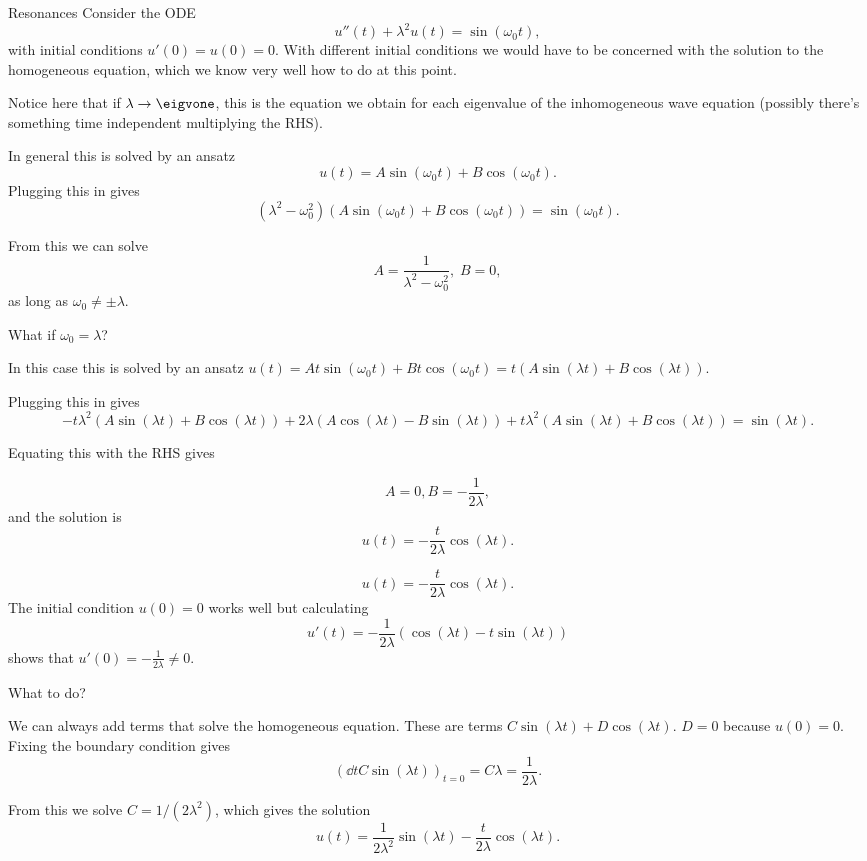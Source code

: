 \begin{frame}{Resonances}
	Consider the ODE 
	\[ u''(t) + \lambda^2 u(t) = \sin(\omega_0 t), \]
	with initial conditions $ u'(0)=u(0) = 0 $. With different initial conditions we would have to be concerned with the solution to the homogeneous equation, which we know very well how to do at this point.
	
	\pause
	Notice here that if $ \lambda \to \eigvone $, this is the equation we obtain for each eigenvalue of the inhomogeneous wave equation (possibly there's something time independent multiplying the RHS). 
	
	\pause
	In general this is solved by an ansatz \[ u(t) = A \sin(\omega_0 t) + B \cos(\omega_0 t). \]
	Plugging this in gives 
	\[  (\lambda^2 -\omega_0^2) (A \sin(\omega_0 t) + B \cos(\omega_0 t)) = \sin(\omega_0 t). \]
\end{frame}

\begin{frame}
	From this we can solve 
	\[ A = \frac{1}{\lambda^2-\omega_0^2}, \; B=0, \]
	as long as $ \omega_0 \neq \pm \lambda $.
	
	\pause
	What if $ \omega_0 = \lambda $?
	
	\pause
	In this case this is solved by an ansatz $ u(t) = A t \sin(\omega_0 t) + B t \cos(\omega_0 t) = t(A  \sin(\lambda t) + B  \cos(\lambda t))$. 
	
	\pause
	Plugging this in gives
	\[ 
	-t \lambda^2 (A  \sin(\lambda t) + B  \cos(\lambda t) ) 
	+ 2 \lambda (A \cos(\lambda t) - B \sin(\lambda t)  ) 
	+ t\lambda^2 (A  \sin(\lambda t) + B  \cos(\lambda t)) 
	= \sin(\lambda t). 
	\]
	
	\pause
	Equating this with the RHS gives 
	
	\pause
	\[ A= 0, B = -\frac{1}{2 \lambda},  \]
	and the solution is 
	\[ u(t) = -\frac{t}{2 \lambda} \cos(\lambda t). \]
\end{frame}

\begin{frame}
	\[ u(t) = -\frac{t}{2 \lambda} \cos(\lambda t). \]
	The initial condition $ u(0) = 0 $ works well but calculating 
	\[ u'(t) = -\frac{1}{2\lambda} \left( \cos(\lambda t) - t \sin(\lambda t) \right) \]
	shows that $ u'(0) = -\frac{1}{2\lambda} \neq 0 $.
	
	\pause
	What to do?
	
	\pause
	We can always add terms that solve the homogeneous equation. These are terms $ C \sin(\lambda t) + D \cos(\lambda t)  $. $ D = 0 $ because $ u(0) = 0 $. Fixing the boundary condition gives 
	\[ \left(\dd{}{t}  C \sin(\lambda t) \right)_{t=0} = C \lambda  = \frac{1}{2\lambda}. \]
	
	\pause
	From this we solve $ C = 1/(2\lambda^2) $, which gives the solution
	\[ u(t) = \frac{1}{2\lambda^2} \sin(\lambda t) - \frac{t}{2\lambda} \cos(\lambda t).  \]
\end{frame}

